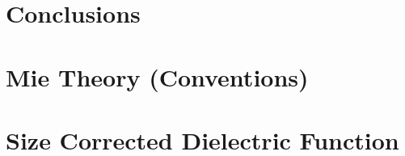 \documentclass[11pt]{Latex/Classes/PhDthesisPSnPDF}
\begin{document}
\chapter{Conclusions}


\appendix

\chapter{Mie Theory (Conventions)}
  \label{app:MieCode}
  

\chapter{Size Corrected Dielectric Function}
  \label{app:SizeCorrection}
  


%
%

\setlength{}
\printbibliography

\newpage
\printindex
\end{document}
